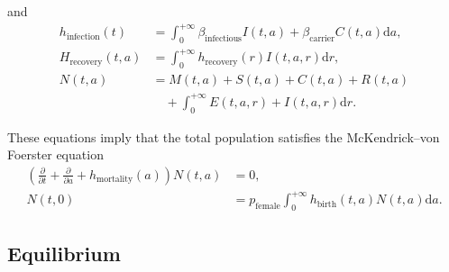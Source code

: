 \documentclass[12pt]{article}
\newcommand{\md}{\mathrm{d}}
\begin{document}
and
\begin{equation}
  \begin{split}
    h_{\text{infection}}(t)
    &= \int_0^{+\infty} \beta_{\text{infectious}} I(t, a)
    + \beta_{\text{carrier}} C(t, a) \md a,
    \\
    H_{\text{recovery}}(t, a)
    &= \int_0^{+\infty}h_{\text{recovery}}(r) I(t, a, r) \md r,
    \\
    N(t, a) &= M(t, a) + S(t, a) + C(t, a) + R(t, a)
    \\ & \quad {}
    + \int_0^{+\infty} E(t, a, r) + I(t, a, r) \md r.
  \end{split}
\end{equation}

These equations imply that the total population satisfies the
McKendrick--von Foerster equation
\begin{equation}
  \begin{split}
    \left(
      \frac{\partial}{\partial t}
      + \frac{\partial}{\partial a}
      + h_{\text{mortality}}(a)
    \right)
    N(t, a)
    &= 0,
    \\
    N(t, 0)
    &= p_{\text{female}}
    \int_0^{+\infty} h_{\text{birth}}(t, a) N(t, a) \md a.
  \end{split}
\end{equation}


\subsection{Equilibrium}
\end{document}

